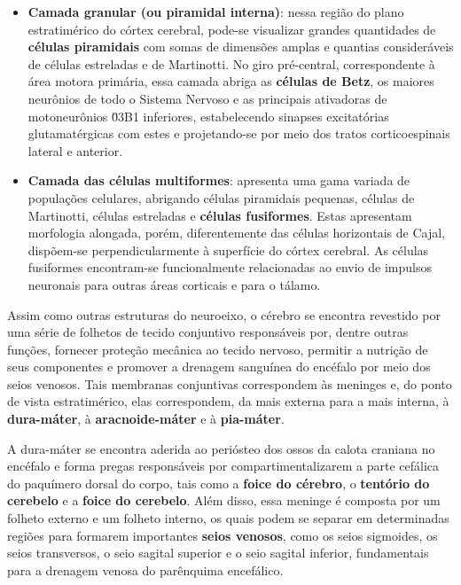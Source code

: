 \documentclass[
]{book}
\theoremstyle{definition}
\theoremstyle{definition}
\theoremstyle{definition}
\theoremstyle{definition}
\theoremstyle{remark}
\begin{document}
\begin{itemize}
\item
  \textbf{Camada granular (ou piramidal interna)}: nessa região do plano estratimérico do córtex cerebral, pode-se visualizar grandes quantidades de \textbf{células piramidais} com somas de dimensões amplas e quantias consideráveis de células estreladas e de Martinotti. No giro pré-central, correspondente à área motora primária, essa camada abriga as \textbf{células de Betz}, os maiores neurônios de todo o Sistema Nervoso e as principais ativadoras de motoneurônios \u03B1 inferiores, estabelecendo sinapses excitatórias glutamatérgicas com estes e projetando-se por meio dos tratos corticoespinais lateral e anterior.
\item
  \textbf{Camada das células multiformes}: apresenta uma gama variada de populações celulares, abrigando células piramidais pequenas, células de Martinotti, células estreladas e \textbf{células fusiformes}. Estas apresentam morfologia alongada, porém, diferentemente das células horizontais de Cajal, dispõem-se perpendicularmente à superfície do córtex cerebral. As células fusiformes encontram-se funcionalmente relacionadas ao envio de impulsos neuronais para outras áreas corticais e para o tálamo.
\end{itemize}

Assim como outras estruturas do neuroeixo, o cérebro se encontra revestido por uma série de folhetos de tecido conjuntivo responsáveis por, dentre outras funções, fornecer proteção mecânica ao tecido nervoso, permitir a nutrição de seus componentes e promover a drenagem sanguínea do encéfalo por meio dos seios venosos. Tais membranas conjuntivas correspondem às meninges e, do ponto de vista estratimérico, elas correspondem, da mais externa para a mais interna, à \textbf{dura-máter}, à \textbf{aracnoide-máter} e à \textbf{pia-máter}.

A dura-máter se encontra aderida ao periósteo dos ossos da calota craniana no encéfalo e forma pregas responsáveis por compartimentalizarem a parte cefálica do paquímero dorsal do corpo, tais como a \textbf{foice do cérebro}, o \textbf{tentório do cerebelo} e a \textbf{foice do cerebelo}. Além disso, essa meninge é composta por um folheto externo e um folheto interno, os quais podem se separar em determinadas regiões para formarem importantes \textbf{seios venosos}, como os seios sigmoides, os seios transversos, o seio sagital superior e o seio sagital inferior, fundamentais para a drenagem venosa do parênquima encefálico.
\end{document}
